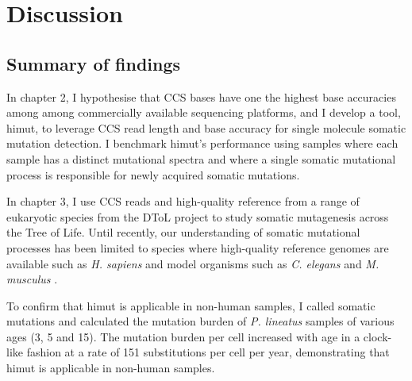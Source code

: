 \chapter{Discussion}

\ifpdf
    \graphicspath{{Chapter4/Figs/Raster/}{Chapter4/Figs/PDF/}{Chapter4/Figs/}}
\else
    \graphicspath{{Chapter4/Figs/Vector/}{Chapter4/Figs/}}
\fi

\section{Summary of findings}

In chapter 2, I hypothesise that CCS bases have one the highest base accuracies among among commercially available sequencing platforms, and I develop a tool, himut, to leverage CCS read length and base accuracy for single molecule somatic mutation detection. I benchmark himut’s performance using samples where each sample has a distinct mutational spectra and where a single somatic mutational process is responsible for newly acquired somatic mutations.  

In chapter 3, I use CCS reads and high-quality reference from a range of eukaryotic species from the DToL project to study somatic mutagenesis across the Tree of Life. Until recently, our understanding of somatic mutational processes has been limited to species where high-quality reference genomes are available such as \textit{H. sapiens} \cite{Alexandrov2013-kg, Alexandrov2020-ys} and model organisms such as \textit{C. elegans} \cite{Meier2014-do} and \textit{M. musculus} \cite{Riva2020-nq}. 

To confirm that himut is applicable in non-human samples, I called somatic mutations and calculated the mutation burden of \textit{P. lineatus} samples of various ages (3, 5 and 15). The mutation burden per cell increased with age in a clock-like fashion at a rate of 151 substitutions per cell per year, demonstrating that himut is applicable in non-human samples. 

